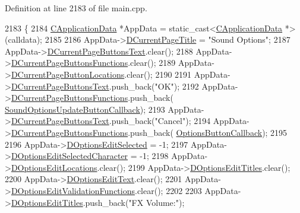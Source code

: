 Definition at line 2183 of file main.\+cpp.


\begin{DoxyCode}
2183                                                                \{
2184     \hyperlink{classCApplicationData}{CApplicationData} *AppData = \textcolor{keyword}{static\_cast<}\hyperlink{classCApplicationData}{CApplicationData} *\textcolor{keyword}{>}(calldata);
2185     
2186     AppData->\hyperlink{classCApplicationData_a49ce7f0b5891f0f2c29b73aad636b761}{DCurrentPageTitle} = \textcolor{stringliteral}{"Sound Options"};
2187     AppData->\hyperlink{classCApplicationData_af04b7f5f8ba4e5c99c0a3530055fc15d}{DCurrentPageButtonsText}.clear();
2188     AppData->\hyperlink{classCApplicationData_ad3079e5563a19d21c1e4ceff2a188382}{DCurrentPageButtonsFunctions}.clear();
2189     AppData->\hyperlink{classCApplicationData_a3615df8e23cea3ce17f11cf61340a7b4}{DCurrentPageButtonLocations}.clear();
2190     
2191     AppData->\hyperlink{classCApplicationData_af04b7f5f8ba4e5c99c0a3530055fc15d}{DCurrentPageButtonsText}.push\_back(\textcolor{stringliteral}{"OK"});
2192     AppData->\hyperlink{classCApplicationData_ad3079e5563a19d21c1e4ceff2a188382}{DCurrentPageButtonsFunctions}.push\_back(
      \hyperlink{classCApplicationData_ae63c8ca19ddeb92a3aaf0a5d67d09e58}{SoundOptionsUpdateButtonCallback});
2193     AppData->\hyperlink{classCApplicationData_af04b7f5f8ba4e5c99c0a3530055fc15d}{DCurrentPageButtonsText}.push\_back(\textcolor{stringliteral}{"Cancel"});
2194     AppData->\hyperlink{classCApplicationData_ad3079e5563a19d21c1e4ceff2a188382}{DCurrentPageButtonsFunctions}.push\_back(
      \hyperlink{classCApplicationData_a3647cf78eb59689b901d4204c81555b4}{OptionsButtonCallback});
2195     
2196     AppData->\hyperlink{classCApplicationData_aee4aa5eb5b89b86eb2648d0f9c7358f9}{DOptionsEditSelected} = -1;
2197     AppData->\hyperlink{classCApplicationData_a921d69021fc61e51d12d8a26a5ac1a89}{DOptionsEditSelectedCharacter} = -1;
2198     AppData->\hyperlink{classCApplicationData_ab4e6804c6e50cca45ab3c3071588da34}{DOptionsEditLocations}.clear();
2199     AppData->\hyperlink{classCApplicationData_a7a322ef6b8c1db3e995c6b493230fd05}{DOptionsEditTitles}.clear();
2200     AppData->\hyperlink{classCApplicationData_a7044dc34cbd9d6776e8ef79eb12b5ce4}{DOptionsEditText}.clear();
2201     AppData->\hyperlink{classCApplicationData_ab76fa444142de66fdb058f390e01112c}{DOptionsEditValidationFunctions}.clear();
2202     
2203     AppData->\hyperlink{classCApplicationData_a7a322ef6b8c1db3e995c6b493230fd05}{DOptionsEditTitles}.push\_back(\textcolor{stringliteral}{"FX Volume:"});

\end{DoxyCode}

